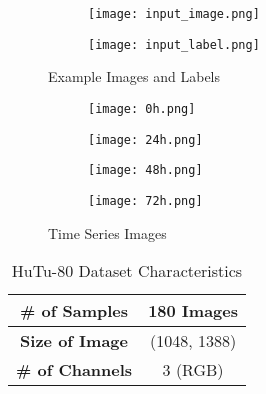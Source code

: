 \documentclass[conference]{IEEEtran}
\begin{document}
\begin{figure}[htbp]
    \centering
    \begin{subfigure}{.2\textwidth}
        \centering
        \texttt{[image: input\_image.png]}
    \end{subfigure}
    \hfill
    \begin{subfigure}{.2\textwidth}
        \centering
        \texttt{[image: input\_label.png]}
    \end{subfigure}
    \caption{Example Images and Labels}
    \label{fig:images}
\end{figure}

\begin{figure}[htbp]
    \centering
    \begin{subfigure}{.2\textwidth}
        \centering
        \texttt{[image: 0h.png]}
    \end{subfigure}
    \hfill
    \begin{subfigure}{.2\textwidth}
        \centering
        \texttt{[image: 24h.png]}
    \end{subfigure}
    \hfill
    \begin{subfigure}{.2\textwidth}
        \centering
        \texttt{[image: 48h.png]}
    \end{subfigure}
    \hfill
    \begin{subfigure}{.2\textwidth}
        \centering
        \texttt{[image: 72h.png]}
    \end{subfigure}
    \caption{Time Series Images}
    \label{fig:images2}
\end{figure}

\begin{table}[htbp]
    \centering
    \caption{HuTu-80 Dataset Characteristics}
    \begin{tabular}{c|c}
        \hline
        \textbf{\# of Samples}  & 180 Images   \\
        \hline
        \textbf{Size of Image}  & (1048, 1388) \\
        \hline
        \textbf{\# of Channels} & 3 (RGB)      \\
        \hline
    \end{tabular}
    \label{tab:dataset_details}
\end{table}
\end{document}
